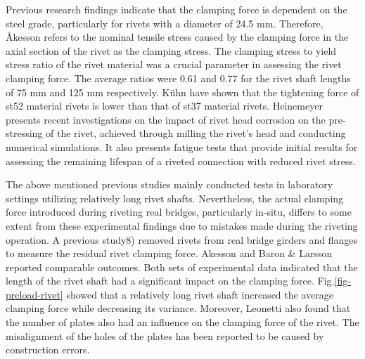 Previous research findings \cite{Zhou1994FatigueMembers} indicate that the clamping force is dependent on the steel grade, particularly for rivets with a diameter of 24.5 mm. Therefore, Åkesson \cite{Akesson2010} refers to the nominal tensile stress caused by the clamping force in the axial section of the rivet as the clamping stress. The clamping stress to yield stress ratio of the rivet material was a crucial parameter in assessing the rivet clamping force. The average ratios were 0.61 and 0.77 for the rivet shaft lengths of 75 mm and 125 mm respectively. K{\"u}hn \cite{Kuhn2008AssessmentLife} have shown that the tightening force of st52 material rivets is lower than that of st37 material rivets. Heinemeyer \cite{Heinemeyer2011TheConnections} presents recent investigations on the impact of rivet head corrosion on the pre-stressing of the rivet, achieved through milling the rivet's head and conducting numerical simulations. It also presents fatigue tests that provide initial results for assessing the remaining lifespan of a riveted connection with reduced rivet stress.

The above mentioned previous studies mainly conducted tests in laboratory settings utilizing relatively long rivet shafts. Nevertheless, the actual clamping force introduced during riveting real bridges, particularly in-situ, differs to some extent from these experimental findings due to mistakes made during the riveting operation. A previous study8) removed rivets from real bridge girders and flanges to measure the residual rivet clamping force. Akesson \cite{Akesson2010} and Baron \& Larsson \cite{Baron1953TheJoints} reported comparable outcomes. Both sets of experimental data indicated that the length of the rivet shaft had a significant impact on the clamping force. Fig.\ref{fig-preload-rivet}  showed that a relatively long rivet shaft increased the average clamping force while decreasing its variance. Moreover, Leonetti \cite{Leonetti2020RivetBridges} also found that the number of plates also had an influence on the clamping force of the rivet. The misalignment of the holes of the plates has been reported to be caused by construction errors.

